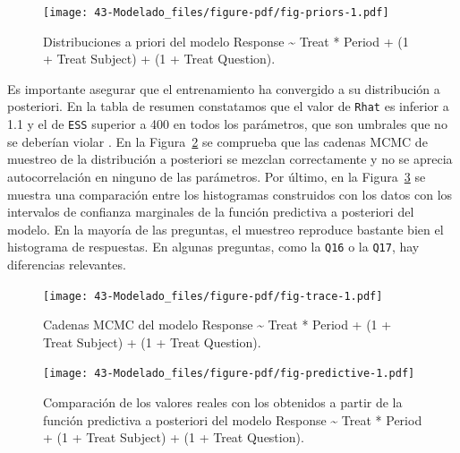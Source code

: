 \documentclass[
  12pt,
  a4paper,
  extrafontsizes,
  onecolumn,
  openright]{memoir}
\begin{document}
\normalsize

\begin{figure}[h]

{\centering \texttt{[image: 43-Modelado\_files/figure-pdf/fig-priors-1.pdf]}

}

\caption{\label{fig-priors}Distribuciones a priori del modelo Response
\textasciitilde{} Treat * Period + (1 + Treat \textbar{} Subject) + (1 +
Treat \textbar{} Question).}

\end{figure}

Es importante asegurar que el entrenamiento ha convergido a su
distribución a posteriori. En la tabla de resumen constatamos que el
valor de \texttt{Rhat} es inferior a 1.1 y el de \texttt{ESS} superior a
400 en todos los parámetros, que son umbrales que no se deberían violar
\autocite[ver][]{burkner2019}. En la Figura~\ref{fig-trace} se comprueba
que las cadenas MCMC de muestreo de la distribución a posteriori se
mezclan correctamente y no se aprecia autocorrelación en ninguno de las
parámetros. Por último, en la Figura~\ref{fig-predictive} se muestra una
comparación entre los histogramas construidos con los datos con los
intervalos de confianza marginales de la función predictiva a posteriori
del modelo. En la mayoría de las preguntas, el muestreo reproduce
bastante bien el histograma de respuestas. En algunas preguntas, como la
\texttt{Q16} o la \texttt{Q17}, hay diferencias relevantes.

\begin{figure}[h]

{\centering \texttt{[image: 43-Modelado\_files/figure-pdf/fig-trace-1.pdf]}

}

\caption{\label{fig-trace}Cadenas MCMC del modelo Response
\textasciitilde{} Treat * Period + (1 + Treat \textbar{} Subject) + (1 +
Treat \textbar{} Question).}

\end{figure}

\begin{figure}[h]

{\centering \texttt{[image: 43-Modelado\_files/figure-pdf/fig-predictive-1.pdf]}

}

\caption{\label{fig-predictive}Comparación de los valores reales con los
obtenidos a partir de la función predictiva a posteriori del modelo
Response \textasciitilde{} Treat * Period + (1 + Treat \textbar{}
Subject) + (1 + Treat \textbar{} Question).}

\end{figure}
\end{document}
